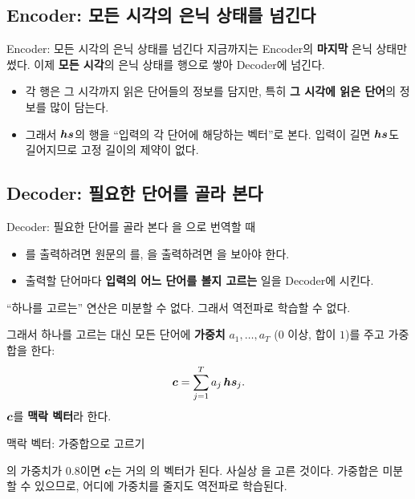 \documentclass[aspectratio=169,11pt]{beamer}
\begin{document}
\subsection{Encoder: 모든 시각의 은닉 상태를 넘긴다}

\begin{frame}{Encoder: 모든 시각의 은닉 상태를 넘긴다}
지금까지는 Encoder의 \textbf{마지막} 은닉 상태만 썼다.
이제 \textbf{모든 시각}의 은닉 상태를 행으로 쌓아 Decoder에 넘긴다.
\begin{itemize}
\item 각 행은 그 시각까지 읽은 단어들의 정보를 담지만,
  특히 \textbf{그 시각에 읽은 단어}의 정보를 많이 담는다.
\item 그래서 $\bm{hs}$의 행을 ``입력의 각 단어에 해당하는 벡터''로 본다.
  입력이 길면 $\bm{hs}$도 길어지므로 고정 길이의 제약이 없다.
\end{itemize}
\end{frame}

\subsection{Decoder: 필요한 단어를 골라 본다}

\begin{frame}{Decoder: 필요한 단어를 골라 본다}
을 으로 번역할 때
\begin{itemize}
\item {}를 출력하려면 원문의 를, 을 출력하려면 을 보아야 한다.
\item 출력할 단어마다 \textbf{입력의 어느 단어를 볼지 고르는} 일을 Decoder에 시킨다.
\end{itemize}
\vskip1mm
\begin{thinkbox}
``하나를 고르는'' 연산은 미분할 수 없다. 그래서 역전파로 학습할 수 없다.
\end{thinkbox}
\vskip1mm
그래서 하나를 고르는 대신 모든 단어에 \textbf{가중치} $a_1,\dots,a_T$
($0$ 이상, 합이 $1$)를 주고 가중합을 한다:
\[
\bm{c}=\sum_{j=1}^T a_j\,\bm{hs}_j .
\]
$\bm{c}$를 \textbf{맥락 벡터}라 한다.
\end{frame}

\begin{frame}{맥락 벡터: 가중합으로 고르기}
\vskip2mm
\begin{keybox}
의 가중치가 $0.8$이면 $\bm{c}$는 거의 의 벡터가 된다.
사실상 을 고른 것이다.
가중합은 미분할 수 있으므로, 어디에 가중치를 줄지도 역전파로 학습된다.
\end{keybox}
\end{frame}
\end{document}
